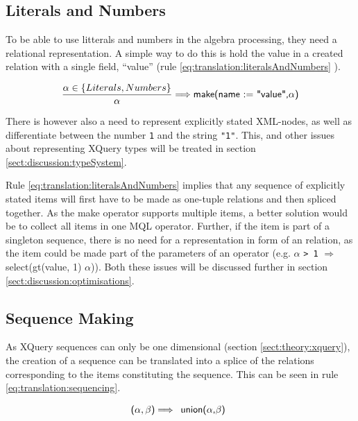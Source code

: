 \subsection{Literals and Numbers}
\label{sect:translation:mXr:litAndNumbers}
To be able to use litterals and numbers in the algebra processing, they need a
relational representation. A simple way to do this is hold the value in a
created relation with a single field, ``value'' (rule
\ref{eq:translation:literalsAndNumbers} ).

\begin{equation}
\centering
\frac{\alpha \in \left\{ Literals, Numbers \right\} }{\alpha}
\Longrightarrow
\textsf{make(name := "value",} \alpha \textsf{)}
\label{eq:translation:literalsAndNumbers}
\end{equation}

There is however also a need to represent explicitly stated XML-nodes, as well
as differentiate between the number \texttt{1} and the string \texttt{"1"}.
This, and other issues about representing XQuery types will be treated in
section \ref{sect:discussion:typeSystem}.

Rule \ref{eq:translation:literalsAndNumbers} implies that any sequence of
explicitly stated items will first have to be made as one-tuple relations and
then spliced together. As the \textsf{make} operator supports multiple items, a
better solution would be to collect all items in one MQL operator. Further, if
the item is part of a singleton sequence, there is no need for a representation
in form of an relation, as the item could be made part of the parameters of an
operator (e.g. $\alpha$ \texttt{> 1} $\Longrightarrow$
\textsf{select(gt(value, 1) $\alpha$)}). Both these issues will be discussed
further in section \ref{sect:discussion:optimisations}.



\subsection{Sequence Making}
\label{sect:translation:mXr:sequencing}
As XQuery sequences can only be one dimensional (section
\ref{sect:theory:xquery}), the creation of a sequence can be translated into a
splice of the relations corresponding to the items constituting the sequence.
This can be seen in rule \ref{eq:translation:sequencing}. 

\begin{equation}
\centering
\textsf{(} \alpha , \beta \textsf{)}
\Longrightarrow
\begin{array}{l}
\mbox{\textsf{union(}} 
\alpha \mbox{\textsf{,}} 
\beta \mbox{\textsf{)}}
\end{array}
\label{eq:translation:sequencing}
\end{equation}


